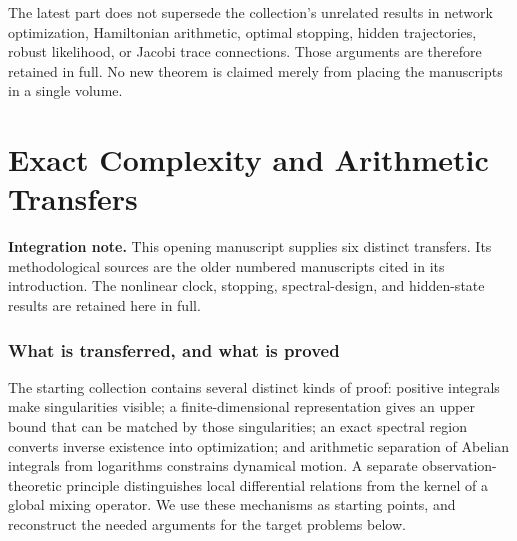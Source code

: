 \documentclass[11pt,a4paper]{article}
\theoremstyle{definition}
\theoremstyle{remark}
\numberwithin{equation}{section}
\newcommand{\collectedpart}[1]{%
 \clearpage\part{#1}%
 \setcounter{section}{0}%
 \renewcommand{\thesection}{\Roman{part}.\arabic{section}}%
 \renewcommand{\theHsection}{p\arabic{part}.s\arabic{section}}%
 \renewcommand{\arraystretch}{1}%
}
\begin{document}
The latest part does not supersede the collection's unrelated results in
network optimization, Hamiltonian arithmetic, optimal stopping, hidden
trajectories, robust likelihood, or Jacobi trace connections. Those
arguments are therefore retained in full. No new theorem is claimed merely
from placing the manuscripts in a single volume.

\clearpage
\begingroup\small
\tableofcontents
\endgroup
\clearpage


\collectedpart{Exact Complexity and Arithmetic Transfers}\label{part:1}

\begin{abstract}
We transfer proof mechanisms from recurrence minimality, period arithmetic,
weighted Laplacian spectra, and mixture identification to six concrete
problems. Products of separated central-trinomial moments have exact
recurrence width $\prod_i(m_i+1)$. Jacobi transforms have exact differential
order $N+1$, increasing to $2^N$ under arbitrarily small separated weights
at even nonnegative Dyson index. For every inverse-power spectral loss,
we determine the unique optimal conductances when a matching of links is
forbidden. Holomorphic time differentials imply simultaneous
transcendence of Hamiltonian coordinates at nonzero algebraic-logarithmic
clock times and a harmonic exception for action-quantized energies.
For a mean-reverting square-root diffusion, we verify power-call stopping
for every positive real power, classify algebraic exercise boundaries by
an exact discount resonance, and prove transcendence of zero-state values
at positive integer discount ratios. Finally, a known emission family with
finite-dimensional mixing defect admits hidden-population recovery from
three visits despite unknown persistence; an explicit positive analytic
family shows both the failure of two visits and the sharp risk
$\Theta(\min\{1,(r^2\sqrt{N})^{-1}\})$ on a specified submodel.
The proofs identify the assumptions and classical inputs of each transfer.
\end{abstract}

\noindent\textbf{Integration note.} This opening manuscript supplies six distinct transfers. Its methodological sources are the older numbered manuscripts cited in its introduction. The nonlinear clock, stopping, spectral-design, and hidden-state results are retained here in full.
\clearpage

\section{What is transferred, and what is proved}
The starting collection contains several distinct kinds of proof: positive
integrals make singularities visible; a finite-dimensional representation
gives an upper bound that can be matched by those singularities; an exact
spectral region converts inverse existence into optimization; and arithmetic
separation of Abelian integrals from logarithms constrains dynamical motion.
A separate observation-theoretic principle distinguishes local differential
relations from the kernel of a global mixing operator. We use these mechanisms
as starting points, and reconstruct the needed arguments for the target
problems below.
\end{document}
